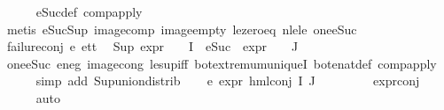\begin{isabellebody}
\ \ \ \ \isamarkupfalse%
\ eSuc{\isacharunderscore}{\kern0pt}def\ comp{\isacharunderscore}{\kern0pt}apply\isanewline
\ \ \ \ \isamarkupfalse%
\ {\isacharparenleft}{\kern0pt}metis\ eSuc{\isacharunderscore}{\kern0pt}Sup\ image{\isacharunderscore}{\kern0pt}comp\ image{\isacharunderscore}{\kern0pt}empty\ le{\isacharunderscore}{\kern0pt}zero{\isacharunderscore}{\kern0pt}eq\ nle{\isacharunderscore}{\kern0pt}le\ one{\isacharunderscore}{\kern0pt}eSuc{\isacharparenright}{\kern0pt}\ \isanewline
\ \ \isamarkupfalse%
\ failure{\isacharunderscore}{\kern0pt}conj\ e{}{\isacharunderscore}{\kern0pt}{}\ e{}{\isacharunderscore}{\kern0pt}tt\ \isamarkupfalse%
\ {\isachardoublequoteopen}{\isacharparenleft}{\kern0pt}Sup\ {\isacharparenleft}{\kern0pt}{\isacharparenleft}{\kern0pt}expr{\isacharunderscore}{\kern0pt}{}\ {\isasymcirc}\ {\isasymPhi}{\isacharparenright}{\kern0pt}\ {\isacharbackquote}{\kern0pt}\ I\ {\isasymunion}\ {\isacharparenleft}{\kern0pt}{\isacharparenleft}{\kern0pt}eSuc\ {\isasymcirc}\ expr{\isacharunderscore}{\kern0pt}{}\ {\isasymcirc}\ {\isasymPhi}{\isacharparenright}{\kern0pt}\ {\isacharbackquote}{\kern0pt}\ J{\isacharparenright}{\kern0pt}{\isacharparenright}{\kern0pt}{\isacharparenright}{\kern0pt}\ {\isasymle}\ {}{\isachardoublequoteclose}\isanewline
\ \ \ \ \isamarkupfalse%
\ one{\isacharunderscore}{\kern0pt}eSuc\ e{}{\isacharunderscore}{\kern0pt}neg\ image{\isacharunderscore}{\kern0pt}cong\ le{\isacharunderscore}{\kern0pt}sup{\isacharunderscore}{\kern0pt}iff\ bot{\isachardot}{\kern0pt}extremum{\isacharunderscore}{\kern0pt}uniqueI\ bot{\isacharunderscore}{\kern0pt}enat{\isacharunderscore}{\kern0pt}def\ comp{\isacharunderscore}{\kern0pt}apply\isanewline
\ \ \ \ \isamarkupfalse%
\ {\isacharparenleft}{\kern0pt}simp\ add{\isacharcolon}{\kern0pt}\ Sup{\isacharunderscore}{\kern0pt}union{\isacharunderscore}{\kern0pt}distrib{\isacharparenright}{\kern0pt}\isanewline
\ \ \isamarkupfalse%
\ e{}{\isacharcolon}{\kern0pt}\ {\isachardoublequoteopen}expr{\isacharunderscore}{\kern0pt}{}\ {\isacharparenleft}{\kern0pt}hml{\isacharunderscore}{\kern0pt}conj\ I\ J\ {\isasymPhi}{\isacharparenright}{\kern0pt}\ {\isasymle}\ {}{\isachardoublequoteclose}\isanewline
\ \ \ \ \isamarkupfalse%
\ expr{\isacharunderscore}{\kern0pt}{}{\isacharunderscore}{\kern0pt}conj\isanewline
\ \ \ \ \isamarkupfalse%
\ auto\isanewline

\end{isabellebody}
